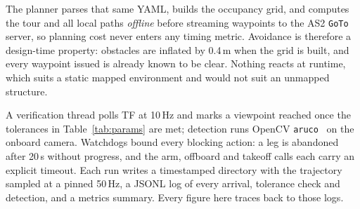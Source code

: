\documentclass[11pt,a4paper]{article}
\begin{document}
The planner parses that same YAML, builds the occupancy grid, and computes the tour and all local paths \emph{offline} before streaming waypoints to the AS2 \texttt{GoTo} server, so planning cost never enters any timing metric. Avoidance is therefore a design-time property: obstacles are inflated by 0.4\,m when the grid is built, and every waypoint issued is already known to be clear. Nothing reacts at runtime, which suits a static mapped environment and would not suit an unmapped structure.

A verification thread polls TF at 10\,Hz and marks a viewpoint reached once the tolerances in Table~\ref{tab:params} are met; detection runs OpenCV \texttt{aruco}~\cite{garrido2014automatic} on the onboard camera. Watchdogs bound every blocking action: a leg is abandoned after 20\,s without progress, and the arm, offboard and takeoff calls each carry an explicit timeout. Each run writes a timestamped directory with the trajectory sampled at a pinned 50\,Hz, a JSONL log of every arrival, tolerance check and detection, and a metrics summary. Every figure here traces back to those logs.
\end{document}
